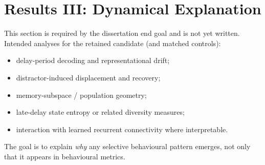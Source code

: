 \section{Results III: Dynamical Explanation}
\label{ch:results-dynamics}

\begin{scaffold}
This section is required by the dissertation end goal and is not yet written.
Intended analyses for the retained candidate (and matched controls):
\begin{itemize}[leftmargin=*]
  \item delay-period decoding and representational drift;
  \item distractor-induced displacement and recovery;
  \item memory-subspace / population geometry;
  \item late-delay state entropy or related diversity measures;
  \item interaction with learned recurrent connectivity where interpretable.
\end{itemize}
The goal is to explain \emph{why} any selective behavioural pattern emerges,
not only that it appears in behavioural metrics.
\end{scaffold}
